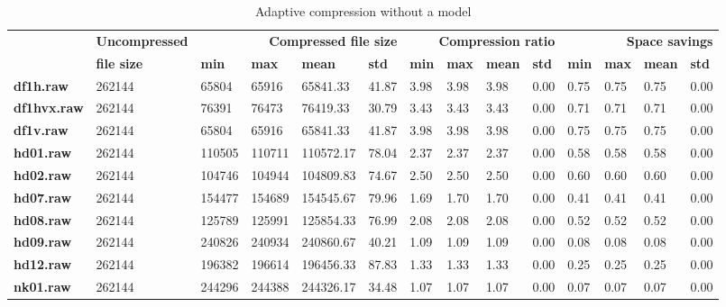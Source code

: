 \begin{table}
\centering
\footnotesize
\begin{tabular}{l|l|llll|llll|llll}
     & \textbf{Uncompressed} & \multicolumn{4}{r|}{\textbf{Compressed file size}} & \multicolumn{4}{r|}{\textbf{Compression ratio}} & \multicolumn{4}{r}{\textbf{Space savings}} \\
     & \textbf{file size} & \textbf{min} & \textbf{max} & \textbf{mean} & \textbf{std} & \textbf{min} & \textbf{max} & \textbf{mean} & \textbf{std} & \textbf{min} & \textbf{max} & \textbf{mean} & \textbf{std} \\
\hline
    \textbf{df1h.raw} & 262144 & 65804 & 65916 & 65841.33 & 41.87 & 3.98 & 3.98 & 3.98 & 0.00 & 0.75 & 0.75 & 0.75 & 0.00 \\
    \textbf{df1hvx.raw} & 262144 & 76391 & 76473 & 76419.33 & 30.79 & 3.43 & 3.43 & 3.43 & 0.00 & 0.71 & 0.71 & 0.71 & 0.00 \\
    \textbf{df1v.raw} & 262144 & 65804 & 65916 & 65841.33 & 41.87 & 3.98 & 3.98 & 3.98 & 0.00 & 0.75 & 0.75 & 0.75 & 0.00 \\
    \textbf{hd01.raw} & 262144 & 110505 & 110711 & 110572.17 & 78.04 & 2.37 & 2.37 & 2.37 & 0.00 & 0.58 & 0.58 & 0.58 & 0.00 \\
    \textbf{hd02.raw} & 262144 & 104746 & 104944 & 104809.83 & 74.67 & 2.50 & 2.50 & 2.50 & 0.00 & 0.60 & 0.60 & 0.60 & 0.00 \\
    \textbf{hd07.raw} & 262144 & 154477 & 154689 & 154545.67 & 79.96 & 1.69 & 1.70 & 1.70 & 0.00 & 0.41 & 0.41 & 0.41 & 0.00 \\
    \textbf{hd08.raw} & 262144 & 125789 & 125991 & 125854.33 & 76.99 & 2.08 & 2.08 & 2.08 & 0.00 & 0.52 & 0.52 & 0.52 & 0.00 \\
    \textbf{hd09.raw} & 262144 & 240826 & 240934 & 240860.67 & 40.21 & 1.09 & 1.09 & 1.09 & 0.00 & 0.08 & 0.08 & 0.08 & 0.00 \\
    \textbf{hd12.raw} & 262144 & 196382 & 196614 & 196456.33 & 87.83 & 1.33 & 1.33 & 1.33 & 0.00 & 0.25 & 0.25 & 0.25 & 0.00 \\
    \textbf{nk01.raw} & 262144 & 244296 & 244388 & 244326.17 & 34.48 & 1.07 & 1.07 & 1.07 & 0.00 & 0.07 & 0.07 & 0.07 & 0.00 \\
\end{tabular}
\caption{Adaptive compression without a model}
\end{table}
